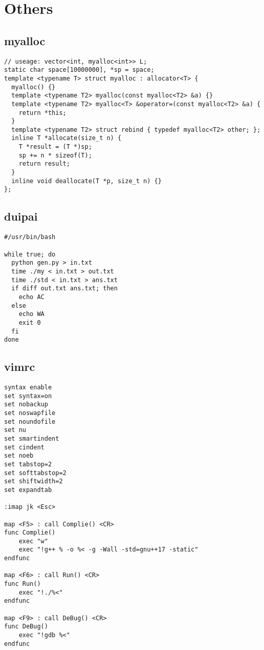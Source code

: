 \documentclass[twoside]{article}
\begin{document}
\section{Others}

\subsection{myalloc}
\begin{lstlisting}
// useage: vector<int, myalloc<int>> L;
static char space[10000000], *sp = space;
template <typename T> struct myalloc : allocator<T> {
  myalloc() {}
  template <typename T2> myalloc(const myalloc<T2> &a) {}
  template <typename T2> myalloc<T> &operator=(const myalloc<T2> &a) {
    return *this;
  }
  template <typename T2> struct rebind { typedef myalloc<T2> other; };
  inline T *allocate(size_t n) {
    T *result = (T *)sp;
    sp += n * sizeof(T);
    return result;
  }
  inline void deallocate(T *p, size_t n) {}
};

\end{lstlisting}
\subsection{duipai}
\begin{lstlisting}
#/usr/bin/bash

while true; do
  python gen.py > in.txt
  time ./my < in.txt > out.txt
  time ./std < in.txt > ans.txt
  if diff out.txt ans.txt; then
    echo AC
  else
    echo WA
    exit 0
  fi
done

\end{lstlisting}
\subsection{vimrc}
\begin{lstlisting}
syntax enable
set syntax=on
set nobackup
set noswapfile
set noundofile
set nu
set smartindent
set cindent
set noeb
set tabstop=2
set softtabstop=2
set shiftwidth=2
set expandtab 

:imap jk <Esc>

map <F5> : call Complie() <CR>
func Complie()
	exec "w"
	exec "!g++ % -o %< -g -Wall -std=gnu++17 -static"
endfunc

map <F6> : call Run() <CR>
func Run()
	exec "!./%<"
endfunc

map <F9> : call DeBug() <CR>
func DeBug()
	exec "!gdb %<"
endfunc

\end{lstlisting}
\end{document}
